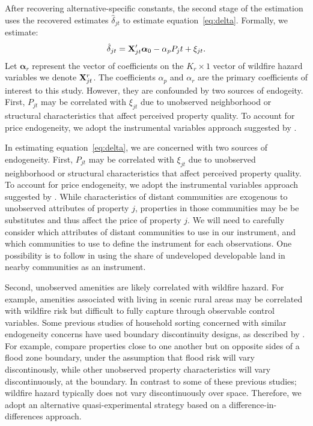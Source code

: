 \documentclass[10pt]{article}
\begin{document}
After recovering alternative-specific constants, the second stage of the estimation uses the recovered estimates $\hat{\delta}_{jt}$ to estimate equation~\ref{eq:delta}. Formally, we estimate:
\begin{align*}
\hat{\delta}_{jt} = {\bf X}'_{jt}{\boldsymbol \alpha}_{0}  - \alpha_p P_jt + \xi_{jt}.
\end{align*}
Let ${\boldsymbol \alpha}_r$ represent the vector of coefficients on the $K_r \times 1$ vector of wildfire hazard variables we denote ${\bf X}^r_{jt}$. The coefficients  $\alpha_p$  and $\alpha_r$ are the primary coefficients of interest to this study. However, they are confounded by two sources of endogeity. First, $P_{jt}$ may be correlated with $\xi_{jt}$ due to unobserved neighborhood or structural characteristics that affect perceived property quality. To account for price endogeneity, we adopt the instrumental variables approach suggested by \citet{bayertimmins}. %

In estimating equation~\ref{eq:delta}, we are concerned with two sources of endogeneity. First, $P_{jt}$ may be correlated with $\xi_{jt}$ due to unobserved neighborhood or structural characteristics that affect perceived property quality. To account for price endogeneity, we adopt the instrumental variables approach suggested by \citet{bayertimmins}. While characteristics of distant communities are exogenous to unobserved attributes of property $j$, properties in those communities may be be substitutes and thus affect the price of property $j$. We will need to carefully consider which attributes of distant communities to use in our instrument, and which communities to use to define the instrument for each observations. One possibility is to follow \citet{bakkensenma} in using the share of undeveloped developable land in nearby communities as an instrument.

Second, unobserved amenities are likely correlated with wildfire hazard. For example, amenities associated with living in scenic rural areas may be correlated with wildfire risk but difficult to fully capture through observable control variables. Some previous studies of household sorting concerned with similar endogeneity concerns have used boundary discontinuity designs, as described by \citet{black1999}. For example, \citet{bakkensenma} compare properties close to one another but on opposite sides of a flood zone boundary, under the assumption that flood risk will vary discontinously, while other unobserved property characteristics will vary discontinuously, at the boundary. In contrast to some of these previous studies; wildfire hazard typically does not vary discontinuously over space. Therefore, we adopt an alternative quasi-experimental strategy based on a difference-in-differences approach.
\end{document}
